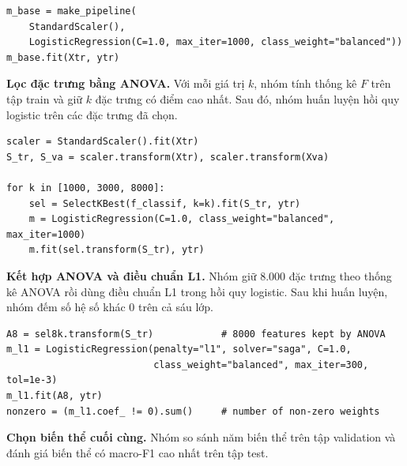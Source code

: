 \begin{lstlisting}[caption={Mô hình hồi quy logistic cơ sở},label={lst:lr_base}]
m_base = make_pipeline(
    StandardScaler(),
    LogisticRegression(C=1.0, max_iter=1000, class_weight="balanced"))
m_base.fit(Xtr, ytr)
\end{lstlisting}

\textbf{Lọc đặc trưng bằng ANOVA.} Với mỗi giá trị $k$, nhóm tính thống kê $F$ trên tập train và giữ $k$ đặc trưng có điểm cao nhất. Sau đó, nhóm huấn luyện hồi quy logistic trên các đặc trưng đã chọn.

\begin{lstlisting}[caption={Lựa chọn đặc trưng bằng thống kê ANOVA},label={lst:lr_kbest}]
scaler = StandardScaler().fit(Xtr)
S_tr, S_va = scaler.transform(Xtr), scaler.transform(Xva)

for k in [1000, 3000, 8000]:
    sel = SelectKBest(f_classif, k=k).fit(S_tr, ytr)
    m = LogisticRegression(C=1.0, class_weight="balanced", max_iter=1000)
    m.fit(sel.transform(S_tr), ytr)
\end{lstlisting}

\textbf{Kết hợp ANOVA và điều chuẩn L1.} Nhóm giữ 8.000 đặc trưng theo thống kê ANOVA rồi dùng điều chuẩn L1 trong hồi quy logistic. Sau khi huấn luyện, nhóm đếm số hệ số khác 0 trên cả sáu lớp.

\begin{lstlisting}[caption={Hồi quy logistic với điều chuẩn L1},label={lst:lr_l1}]
A8 = sel8k.transform(S_tr)            # 8000 features kept by ANOVA
m_l1 = LogisticRegression(penalty="l1", solver="saga", C=1.0,
                          class_weight="balanced", max_iter=300, tol=1e-3)
m_l1.fit(A8, ytr)
nonzero = (m_l1.coef_ != 0).sum()     # number of non-zero weights
\end{lstlisting}

\textbf{Chọn biến thể cuối cùng.} Nhóm so sánh năm biến thể trên tập validation và đánh giá biến thể có macro-F1 cao nhất trên tập test.
